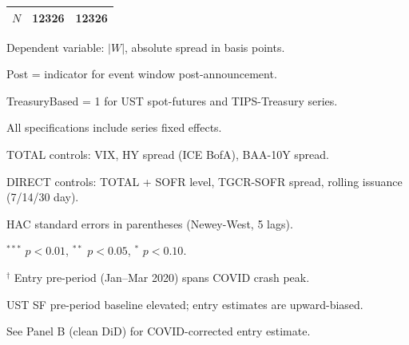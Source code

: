 \begin{table}[htbp]
\begin{tabular}{l cccc cccc}
\quad $N$ & \multicolumn{4}{c}{12326} & \multicolumn{4}{c}{12326} \\
\hline
\hline
\end{tabular}
\begin{tablenotes}
\footnotesize
\item Dependent variable: $|W|$, absolute spread in basis points.
\item Post = indicator for event window post-announcement.
\item TreasuryBased = 1 for UST spot-futures and TIPS-Treasury series.
\item All specifications include series fixed effects.
\item TOTAL controls: VIX, HY spread (ICE BofA), BAA-10Y spread.
\item DIRECT controls: TOTAL + SOFR level, TGCR-SOFR spread, rolling issuance (7/14/30 day).
\item HAC standard errors in parentheses (Newey-West, 5 lags).
\item $^{***}$ $p<0.01$, $^{**}$ $p<0.05$, $^{*}$ $p<0.10$.
\item $^\dagger$ Entry pre-period (Jan--Mar 2020) spans COVID crash peak.
\item \quad UST SF pre-period baseline elevated; entry estimates are upward-biased.
\item \quad See Panel B (clean DiD) for COVID-corrected entry estimate.
\end{tablenotes}
\end{table}